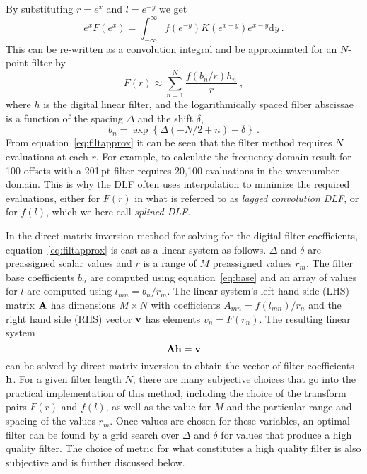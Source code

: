 \documentclass[paper,twocolumn,twoside]{geophysics}
\newcommand{\mr}[1]{\mathrm{#1}}
\begin{document}
By substituting $r = e^x$ and $l = e^{-y}$ we get
%
\begin{equation}
  e^x F(e^x) = \int^\infty_{-\infty} f(e^{-y})K(e^{x-y})e^{x-y}\mr{d}y\ .
  \label{eq:filtint}
\end{equation}
%
This can be re-written as a convolution integral and be approximated for an
$N$-point filter by
%
\begin{equation}
  F(r) \approx \sum^N_{n=1} \frac{f(b_n/r) h_n}{r}\ ,
  \label{eq:filtapprox}
\end{equation}
%
where $h$ is the digital linear filter, and the logarithmically spaced filter
abscissae is a function of the spacing $\Delta$ and the shift $\delta$,
%
\begin{equation}
  b_n = \exp\left\{\Delta(-N/2+n) + \delta\right\} \ .
  \label{eq:base}
\end{equation}
%
From equation~\ref{eq:filtapprox} it can be seen that the filter method
requires $N$ evaluations at each $r$. For example, to calculate the frequency
domain result for 100 offsets with a 201\,pt filter requires 20,100 evaluations
in the wavenumber domain. This is why the DLF often uses interpolation to
minimize the required evaluations, either for $F(r)$ in what is referred to as
\emph{lagged convolution DLF}, or for $f(l)$, which we here call \emph{splined
DLF}.

In the direct matrix inversion method for solving for the digital filter
coefficients, equation~\ref{eq:filtapprox} is cast as a linear system as
follows. $\Delta$ and $\delta$ are preassigned scalar values and $r$ is a range
of $M$ preassigned values $r_m$. The filter base coefficients $b_n$ are
computed using equation~\ref{eq:base} and an array of values for $l$ are
computed using $l_{mn} = b_n/r_m$. The linear system's left hand side (LHS)
matrix $\bf{A}$ has dimensions $M \times N$ with coefficients $A_{mn} =
f(l_{mn})/r_n$ and the right hand side (RHS) vector $\bf{v}$ has elements $v_n
= F(r_n)$. The resulting linear system
%
\begin{equation}
  \bf{A}\bf{h} = \bf{v}
  \label{eq:,linearSystem}
\end{equation}
%
can be solved by direct matrix inversion to obtain the vector of filter
coefficients $\bf{h}$. For a given filter length $N$, there are many subjective
choices that go into the practical implementation of this method, including the
choice of the transform pairs $F(r)$ and $f(l)$, as well as the value for $M$
and the particular range and spacing of the values $r_m$. Once values are
chosen for these variables, an optimal filter can be found by a grid search
over $\Delta$ and $\delta$ for values that produce a high quality filter. The
choice of metric for what constitutes a high quality filter is also subjective
and is further discussed below.
\end{document}
